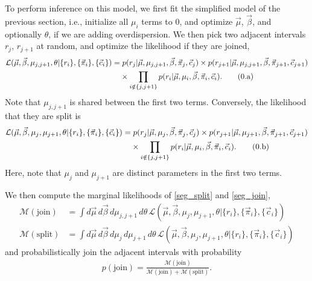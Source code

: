 \documentclass[10pt,letter]{article}
\numberwithin{equation}{section}
\newcommand{\btag}[1]{\addtocounter{equation}{1}\label{#1}\tag{\arabic{section}.\alph{equation}}}
\newcommand{\textop}[1]{\operatorname{#1}}
\begin{document}
To perform inference on this model, we first fit the simplified model of the previous section, i.e., initialize all $\mu_i$ terms to 0, and optimize $\vec\mu$, $\vec\beta$, and optionally $\theta$, if we are adding overdispersion. We then pick two adjacent intervals $r_j$, $r_{j+1}$ at random, and optimize the likelihood if they are joined,
\begin{align*}
\mathcal{L}(\vec \mu,\vec\beta,\mu_{j,j+1},\theta|\{r_i\},\{\vec \pi_i\},\{\vec c_i\}) &= p(r_j|\vec\mu, \mu_{j,j+1},\vec\beta,\vec \pi_j, \vec c_j)\times p(r_{j+1}|\vec\mu, \mu_{j,j+1},\vec\beta,\vec \pi_{j+1}, \vec c_{j+1})\\
&\phantom{{}=}\times\prod_{i\notin\{j,j+1\}} p(r_i|\vec\mu, \mu_i,\vec\beta,\vec \pi_i, \vec c_i).\btag{seg_join}
\end{align*}
Note that $\mu_{j,j+1}$ is shared between the first two terms. Conversely, the likelihood that they are split is
\begin{align*}
\mathcal{L}(\vec \mu,\vec\beta,\mu_{j},\mu_{j+1},\theta|\{r_i\},\{\vec \pi_i\},\{\vec c_i\}) &= p(r_j|\vec\mu, \mu_{j},\vec\beta,\vec \pi_j, \vec c_j)\times p(r_{j+1}|\vec\mu, \mu_{j+1},\vec\beta,\vec \pi_{j+1}, \vec c_{j+1})\\
&\phantom{{}=}\times\prod_{i\notin\{j,j+1\}} p(r_i|\vec\mu, \mu_i,\vec\beta,\vec \pi_i, \vec c_i).\btag{seg_split}
\end{align*}
Here, note that $\mu_j$ and $\mu_{j+1}$ are distinct parameters in the first two terms.

We then compute the marginal likelihoods of \eqref{seg_split} and \eqref{seg_join},
\begin{align*}
\mathcal{M}(\text{join}) &= \int d\vec\mu\,d\vec\beta\,d\mu_{j,j+1}\,d\theta\, \mathcal{L}(\vec \mu,\vec\beta,\mu_{j},\mu_{j+1},\theta|\{r_i\},\{\vec \pi_i\},\{\vec c_i\})\\
\mathcal{M}(\text{split}) &= \int d\vec\mu\,d\vec\beta\,d\mu_{j}\,d\mu_{j+1}\,d\theta\, \mathcal{L}(\vec \mu,\vec\beta,\mu_{j},\mu_{j+1},\theta|\{r_i\},\{\vec \pi_i\},\{\vec c_i\})
\end{align*}
and probabilistically join the adjacent intervals with probability
\begin{align*}
p(\text{join}) = \frac{\mathcal{M}(\text{join})}{\mathcal{M}(\text{join})+\mathcal{M}(\text{split})}.
\end{align*}
\end{document}
